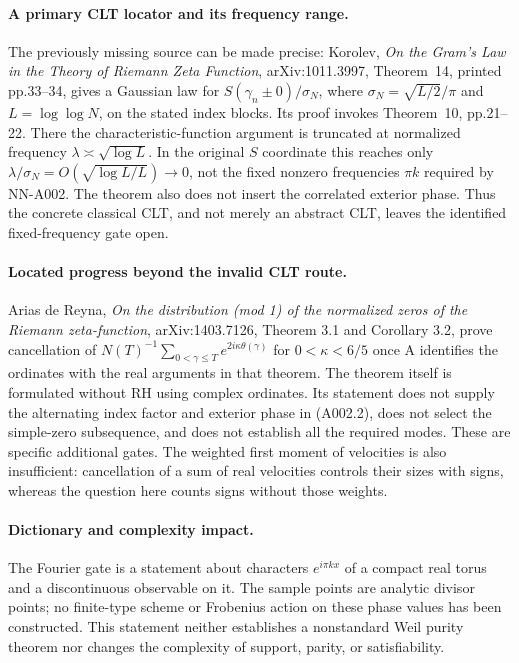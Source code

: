 \paragraph{A primary CLT locator and its frequency range.}
The previously missing source can be made precise: Korolev,
\emph{On the Gram's Law in the Theory of Riemann Zeta Function},
arXiv:1011.3997, Theorem~14, printed pp.33--34, gives a Gaussian
law for $S(\gamma_n\pm0)/\sigma_N$, where
$\sigma_N=\sqrt{L/2}/\pi$ and $L=\log\log N$, on the stated
index blocks. Its proof invokes Theorem~10, pp.21--22. There the
characteristic-function argument is truncated at normalized frequency
$\lambda\asymp\sqrt{\log L}$. In the original $S$ coordinate
this reaches only $\lambda/\sigma_N
=O(\sqrt{\log L/L})\to0$, not the fixed nonzero frequencies
$\pi k$ required by NN-A002. The theorem also does not insert the
correlated exterior phase. Thus the concrete classical CLT, and not
merely an abstract CLT, leaves the identified fixed-frequency gate open.

\paragraph{Located progress beyond the invalid CLT route.}
Arias de Reyna, \emph{On the distribution (mod 1) of the normalized zeros
of the Riemann zeta-function}, arXiv:1403.7126, Theorem 3.1 and Corollary
3.2, prove cancellation of
$N(T)^{-1}\sum_{0<\gamma\leq T}e^{2i\kappa\theta(\gamma)}$ for
$0<\kappa<6/5$ once A identifies the ordinates with the real arguments
in that theorem.  The theorem itself is formulated without RH using
complex ordinates.  Its statement does not supply the alternating index
factor and exterior phase in (A002.2), does not select the simple-zero
subsequence, and does not establish all the required modes.  These are
specific additional gates.  The weighted first moment of velocities is
also insufficient: cancellation of a sum of real velocities controls
their sizes with signs, whereas the question here counts signs without
those weights.

\paragraph{Dictionary and complexity impact.}
The Fourier gate is a statement about characters $e^{i\pi kx}$ of a
compact real torus and a discontinuous observable on it.  The sample
points are analytic divisor points; no finite-type scheme or Frobenius
action on these phase values has been constructed.  This statement
neither establishes a nonstandard Weil purity theorem nor changes the
complexity of support, parity, or satisfiability.


